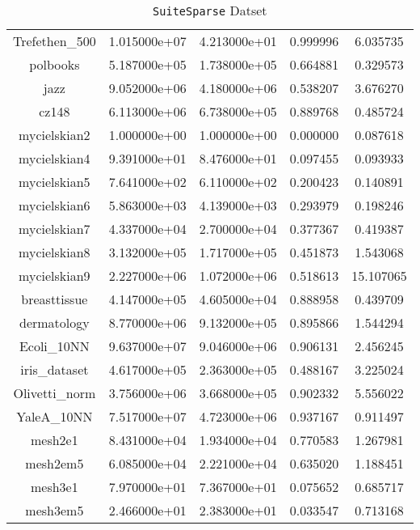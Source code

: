 \begin{table}[h]
\begin{tabular}{ccccc}
    Trefethen\_500 & 1.015000e+07 & 4.213000e+01 & 0.999996 & 6.035735\\
    polbooks & 5.187000e+05 & 1.738000e+05 & 0.664881 & 0.329573\\
    jazz & 9.052000e+06 & 4.180000e+06 & 0.538207 & 3.676270\\
    cz148 & 6.113000e+06 & 6.738000e+05 & 0.889768 & 0.485724\\
    mycielskian2 & 1.000000e+00 & 1.000000e+00 & 0.000000 & 0.087618\\
    mycielskian4 & 9.391000e+01 & 8.476000e+01 & 0.097455 & 0.093933\\
    mycielskian5 & 7.641000e+02 & 6.110000e+02 & 0.200423 & 0.140891\\
    mycielskian6 & 5.863000e+03 & 4.139000e+03 & 0.293979 & 0.198246\\
    mycielskian7 & 4.337000e+04 & 2.700000e+04 & 0.377367 & 0.419387\\
    mycielskian8 & 3.132000e+05 & 1.717000e+05 & 0.451873 & 1.543068\\
    mycielskian9 & 2.227000e+06 & 1.072000e+06 & 0.518613 & 15.107065\\
    breasttissue & 4.147000e+05 & 4.605000e+04 & 0.888958 & 0.439709\\
    dermatology & 8.770000e+06 & 9.132000e+05 & 0.895866 & 1.544294\\
    Ecoli\_10NN & 9.637000e+07 & 9.046000e+06 & 0.906131 & 2.456245\\
    iris\_dataset & 4.617000e+05 & 2.363000e+05 & 0.488167 & 3.225024\\
    Olivetti\_norm & 3.756000e+06 & 3.668000e+05 & 0.902332 & 5.556022\\
    YaleA\_10NN & 7.517000e+07 & 4.723000e+06 & 0.937167 & 0.911497\\
    mesh2e1 & 8.431000e+04 & 1.934000e+04 & 0.770583 & 1.267981\\
    mesh2em5 & 6.085000e+04 & 2.221000e+04 & 0.635020 & 1.188451\\
    mesh3e1 & 7.970000e+01 & 7.367000e+01 & 0.075652 & 0.685717\\
    mesh3em5 & 2.466000e+01 & 2.383000e+01 & 0.033547 & 0.713168\\
    \hline
  \end{tabular}
  \caption{\texttt{SuiteSparse} Datset}
\end{table}